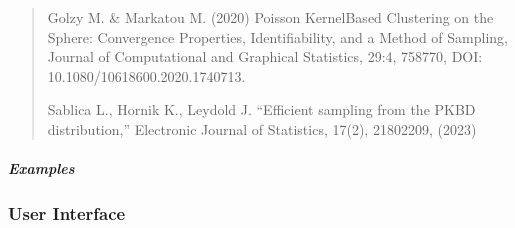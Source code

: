 \documentclass[letterpaper,10pt,english,openany,oneside]{sphinxmanual}
\begin{document}
{{{{\begin{fulllineitems}
\begin{quote}
\sphinxAtStartPar
Golzy M. \& Markatou M. (2020) Poisson Kernel\sphinxhyphen{}Based
Clustering on the Sphere: Convergence Properties, Identifiability,
and a Method of Sampling, Journal of Computational and Graphical Statistics,
29:4, 758\sphinxhyphen{}770, DOI: 10.1080/10618600.2020.1740713.

\sphinxAtStartPar
Sablica L., Hornik K., Leydold J. “Efficient sampling from the PKBD
distribution,” Electronic Journal of Statistics, 17(2), 2180\sphinxhyphen{}2209, (2023)
\end{quote}


\subparagraph{Examples}
\label{\detokenize{api_reference/generated/QuadratiK.spherical_clustering.PKBD:examples}}
\begin{sphinxVerbatim}[commandchars=\\\{\}]
   
  \PYG{p}{[}\PYG{p}{]}   
    \PYG{p}{[}\PYG{p}{]}
\PYG{p}{[}     
       \PYG{p}{]}
\end{sphinxVerbatim}

\end{fulllineitems}




\subsubsection{User Interface}
\label{\detokenize{api_reference/index:user-interface}}\label{\detokenize{api_reference/index:module-QuadratiK.ui}}

}}}}
\end{document}
